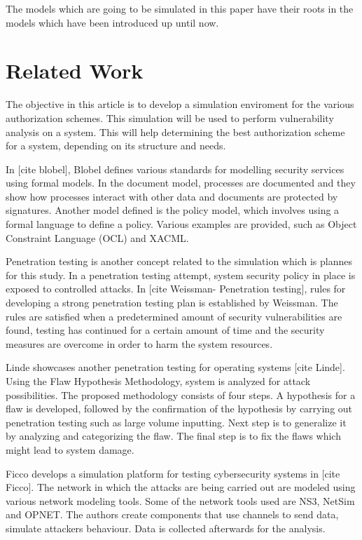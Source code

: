 \documentclass[11pt]{article} %
\begin{document}
The models which are going to be simulated in this paper have their roots in the models which have been introduced up until now.  

\section{Related Work}

The objective in this article is to develop a simulation enviroment for the various authorization schemes. 
This simulation will be used to perform vulnerability analysis on a system. 
This will help determining the best authorization scheme for a system, depending on its structure and needs.

In [cite blobel], Blobel defines various standards for modelling security services using formal models. 
In the document model, processes are documented and they show how processes interact with other data and documents are protected by signatures. 
Another model defined is the policy model, which involves using a formal language to define a policy. 
Various examples are provided, such as Object Constraint Language (OCL) and XACML.

Penetration testing is another concept related to the simulation which is plannes for this study.
In a penetration testing attempt, system security policy in place is exposed to controlled attacks.
In [cite Weissman- Penetration testing], rules for developing a strong penetration testing plan is established by Weissman.
The rules are satisfied when a predetermined amount of security vulnerabilities are found, testing has continued for a certain amount of time and the security measures are overcome in order to harm the system resources.

Linde showcases another penetration testing for operating systems [cite Linde].
Using the Flaw Hypothesis Methodology, system is analyzed for attack possibilities.
The proposed methodology consists of four steps.
A hypothesis for a flaw is developed, followed by the confirmation of the hypothesis by carrying out penetration testing such as large volume inputting.
Next step is to generalize it by analyzing and categorizing the flaw.
The final step is to fix the flaws which might lead to system damage.

Ficco develops a simulation platform for testing cybersecurity systems in [cite Ficco]. 
The network in which the attacks are being carried out are modeled using various network modeling tools. 
Some of the network tools used are NS3, NetSim and OPNET. 
The authors create components that use channels to send data, simulate attackers behaviour. 
Data is collected afterwards for the analysis.
\end{document}
